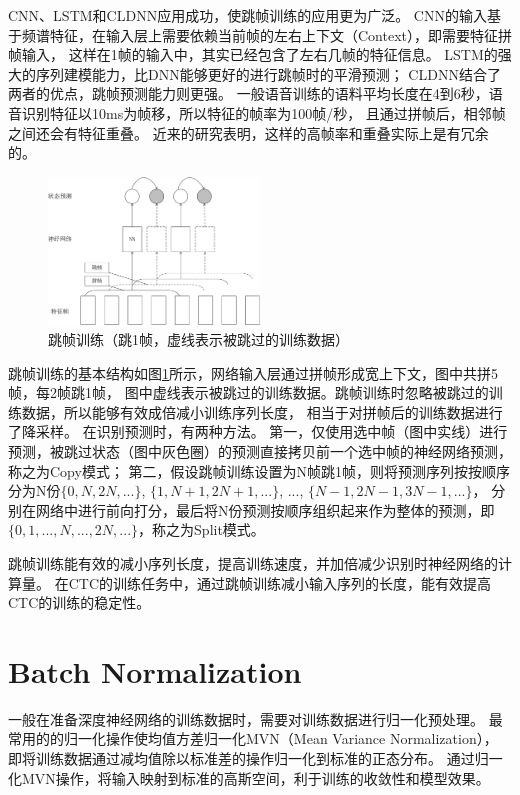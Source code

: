 CNN、LSTM和CLDNN应用成功，使跳帧训练的应用更为广泛。
CNN的输入基于频谱特征，在输入层上需要依赖当前帧的左右上下文（Context），即需要特征拼帧输入，
这样在1帧的输入中，其实已经包含了左右几帧的特征信息。
LSTM的强大的序列建模能力，比DNN能够更好的进行跳帧时的平滑预测；
CLDNN结合了两者的优点，跳帧预测能力则更强。
一般语音训练的语料平均长度在4到6秒，语音识别特征以10ms为帧移，所以特征的帧率为100帧/秒，
且通过拼帧后，相邻帧之间还会有特征重叠。
近来的研究表明，这样的高帧率和重叠实际上是有冗余的。

\begin{figure}[htbp]
\centering
\includegraphics[width=0.5\textwidth]{figures/chapter3/skip-crop}
\caption{跳帧训练（跳1帧，虚线表示被跳过的训练数据）}
\label{fig:skip}
\end{figure}


跳帧训练的基本结构如图\ref{fig:skip}所示，网络输入层通过拼帧形成宽上下文，图中共拼5帧，每2帧跳1帧，
图中虚线表示被跳过的训练数据。跳帧训练时忽略被跳过的训练数据，所以能够有效成倍减小训练序列长度，
相当于对拼帧后的训练数据进行了降采样。
在识别预测时，有两种方法。
第一，仅使用选中帧（图中实线）进行预测，被跳过状态（图中灰色圈）的预测直接拷贝前一个选中帧的神经网络预测，称之为Copy模式；
第二，假设跳帧训练设置为N帧跳1帧，则将预测序列按按顺序分为N份$\{0, N, 2N, ...\}$, $\{1, N+1, 2N+1, ...\}$, ..., $\{N-1, 2N-1, 3N-1, ...\}$，
分别在网络中进行前向打分，最后将N份预测按顺序组织起来作为整体的预测，即$\{0, 1, ..., N, ..., 2N, ...\}$，称之为Split模式。


跳帧训练能有效的减小序列长度，提高训练速度，并加倍减少识别时神经网络的计算量。
在CTC的训练任务中，通过跳帧训练减小输入序列的长度，能有效提高CTC的训练的稳定性。

\section{Batch Normalization}

一般在准备深度神经网络的训练数据时，需要对训练数据进行归一化预处理。
最常用的的归一化操作使均值方差归一化MVN（Mean Variance Normalization），
即将训练数据通过减均值除以标准差的操作归一化到标准的正态分布。
通过归一化MVN操作，将输入映射到标准的高斯空间，利于训练的收敛性和模型效果。

